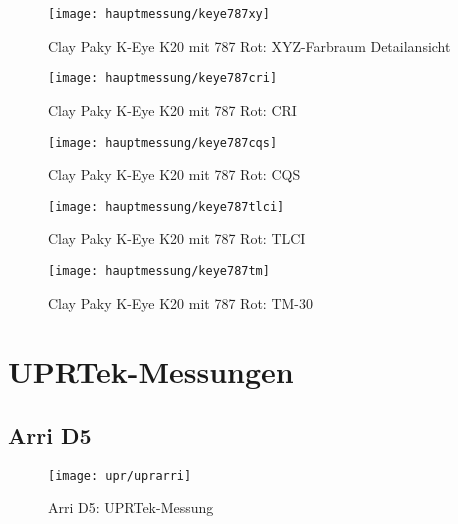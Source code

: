 \documentclass[pagesize,paper=A4,fontsize=12pt,utf8,numbers=noenddot,bibliography=totoc,listof=totoc,DIV=11,BCOR=1mm]{scrreprt}
\begin{document}
\begin{figure}[htp]     %
\centering
\texttt{[image: hauptmessung/keye787xy]} 
\caption {Clay Paky K-Eye K20 mit 787 Rot: XYZ-Farbraum Detailansicht} 
\end{figure}

\begin{figure}[htp]     %
\centering
\texttt{[image: hauptmessung/keye787cri]} 
\caption {Clay Paky K-Eye K20 mit 787 Rot: CRI} 
\end{figure}

\begin{figure}[htp]     %
\centering
\texttt{[image: hauptmessung/keye787cqs]} 
\caption {Clay Paky K-Eye K20 mit 787 Rot: CQS} 
\end{figure}

\begin{figure}[htp]     %
\centering
\texttt{[image: hauptmessung/keye787tlci]} 
\caption {Clay Paky K-Eye K20 mit 787 Rot: TLCI} 
\end{figure}

\begin{figure}[htp]     %
\centering
\texttt{[image: hauptmessung/keye787tm]} 
\caption {Clay Paky K-Eye K20 mit 787 Rot: TM-30} 
\end{figure}


\section{UPRTek-Messungen}

\subsection{Arri D5}

\begin{figure}[htp]     %
\centering
\texttt{[image: upr/uprarri]} 
\caption {Arri D5: UPRTek-Messung} 
\end{figure}
\end{document}
